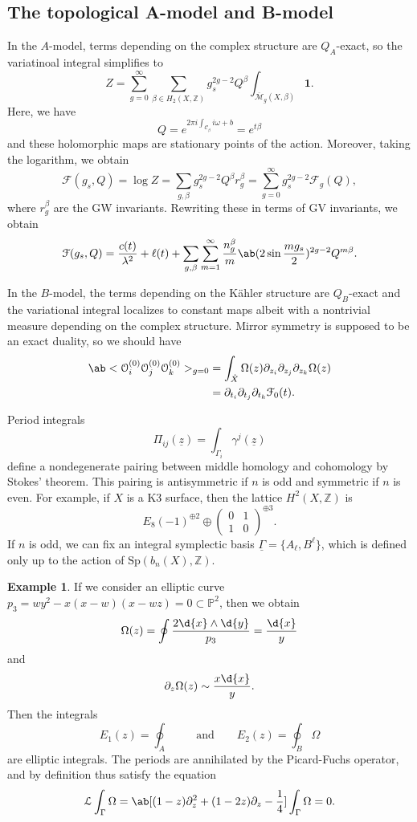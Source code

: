 \documentclass[10pt]{amsart}
\theoremstyle{definition}
\newtheorem{exm}[thm]{Example}
\theoremstyle{remark}
\theoremstyle{plain}
\theoremstyle{definition}
\theoremstyle{remark}
\newcommand{\Z}{\mathbb{Z}}
\renewcommand{\P}{\mathbb{P}}
\newcommand{\Mbar}{\overline{\mathcal{M}}}
\newcommand{\mc}[1]{\mathcal{#1}}
\newcommand{\uz}{\ul{z}}
\newcommand{\mr}[1]{\mathrm{#1}}
\newcommand{\ul}[1]{\underline{#1}}
\newcommand{\1}{\mathbf{1}}
\newcommand{\2}{\mathbf{2}}
\newcommand{\3}{\mathbf{3}}
\begin{document}
\subsection{The topological A-model and B-model}%
\label{sub:The topological A-model}

In the $A$-model, terms depending on the complex structure are $Q_A$-exact, so the variatinoal integral simplifies to
\[ Z = \sum_{g=0}^{\infty} \sum_{\beta \in H_2(X,\Z)} g_s^{2g-2} Q^{\beta} \int_{\Mbar_g(X,\beta)} \1. \]
Here, we have
\[ Q = e^{2\pi i \int_{\mc{C}_{\beta}}i\omega+b} = e^{t\beta} \]
and these holomorphic maps are stationary points of the action. Moreover, taking the logarithm, we obtain
\[ \mc{F}(g_s, Q) = \log Z = \sum_{g,\beta} g_s^{2g-2} Q^{\beta} r_g^{\beta} = \sum_{g=0}^{\infty} g_s^{2g-2} \mc{F}_g(Q), \]
where $r_g^{\beta}$ are the GW invariants.
Rewriting these in terms of GV invariants, we obtain
\[ \mc{F}(g_s, Q) = \frac{c(t)}{\lambda^2} + \ell(t) + \sum_{g,\beta} \sum_{m=1}^{\infty} \frac{n_g^{\beta}}{m}\ab(2 \sin \frac{m g_s}{2})^{2g-2} Q^{m\beta}. \]


In the $B$-model, the terms depending on the K\"ahler structure are $Q_B$-exact and the variational integral localizes to constant maps albeit with a nontrivial measure depending on the complex structure. Mirror symmetry is supposed to be an exact duality, so we should have
\begin{align*}
    \ab<\mc{O}_i^{(0)} \mc{O}_j^{(0)} \mc{O}_k^{(0)}>_{g=0} &= \int_{\hat{X}} \Omega(z) \partial_{z_i} \partial_{z_j} \partial_{z_k} \Omega(z) \\
    &= \partial_{t_i} \partial_{t_j} \partial_{t_k} \mc{F}_0(t).
\end{align*}

Period integrals
\[ \Pi_{ij}(\uz) = \int_{\Gamma_i} \gamma^j(\uz) \]
define a nondegenerate pairing between middle homology and cohomology by Stokes' theorem. This pairing is antisymmetric if $n$ is odd and symmetric if $n$ is even. For example, if $X$ is a K3 surface, then the lattice $H^2(X,\Z)$ is
\[ E_8(-1)^{\oplus 2} \oplus \begin{pmatrix}
    0 & 1 \\
    1 & 0
\end{pmatrix}^{\oplus 3}.
\]
If $n$ is odd, we can fix an integral symplectic basis $\ul{\Gamma} = \{A_{\ell}, B^{\ell}\}$, which is defined only up to the action of $\mr{Sp}(b_n(X), \Z)$.

\begin{exm}
    If we consider an elliptic curve $p_3 = wy^2-x(x-w)(x-wz) = 0 \subset \P^2$, then we obtain
    \[ \Omega(z) = \oint \frac{2 \d{x} \wedge \d{y}}{p_3} = \frac{\d{x}}{y} \]
    and
    \[ \partial_z \Omega(z) \sim \frac{x\d{x}}{y}. \]
    Then the integrals 
    \[ E_1(z) = \oint_A \qquad \text{and} \qquad E_2(z) = \oint_B \Omega \]
    are elliptic integrals. The periods are annihilated by the Picard-Fuchs operator, and by definition thus satisfy the equation
    \[ \mc{L} \int_{\Gamma} \Omega = \ab[(1-z)\partial_z^2 + (1-2z) \partial_z - \frac{1}{4}] \int_{\Gamma} \Omega = 0. \]
\end{exm}
\end{document}

